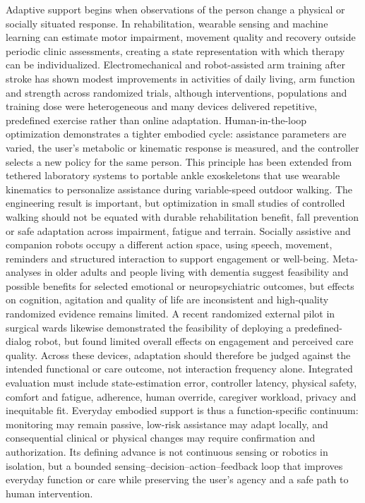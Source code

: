 \documentclass[12pt,a4paper]{article}
\begin{document}
Adaptive support begins when observations of the person change a physical or socially situated response. In rehabilitation, wearable sensing and machine learning can estimate motor impairment, movement quality and recovery outside periodic clinic assessments, creating a state representation with which therapy can be individualized. Electromechanical and robot-assisted arm training after stroke has shown modest improvements in activities of daily living, arm function and strength across randomized trials, although interventions, populations and training dose were heterogeneous and many devices delivered repetitive, predefined exercise rather than online adaptation. Human-in-the-loop optimization demonstrates a tighter embodied cycle: assistance parameters are varied, the user's metabolic or kinematic response is measured, and the controller selects a new policy for the same person. This principle has been extended from tethered laboratory systems to portable ankle exoskeletons that use wearable kinematics to personalize assistance during variable-speed outdoor walking. The engineering result is important, but optimization in small studies of controlled walking should not be equated with durable rehabilitation benefit, fall prevention or safe adaptation across impairment, fatigue and terrain. Socially assistive and companion robots occupy a different action space, using speech, movement, reminders and structured interaction to support engagement or well-being. Meta-analyses in older adults and people living with dementia suggest feasibility and possible benefits for selected emotional or neuropsychiatric outcomes, but effects on cognition, agitation and quality of life are inconsistent and high-quality randomized evidence remains limited. A recent randomized external pilot in surgical wards likewise demonstrated the feasibility of deploying a predefined-dialog robot, but found limited overall effects on engagement and perceived care quality. Across these devices, adaptation should therefore be judged against the intended functional or care outcome, not interaction frequency alone. Integrated evaluation must include state-estimation error, controller latency, physical safety, comfort and fatigue, adherence, human override, caregiver workload, privacy and inequitable fit. Everyday embodied support is thus a function-specific continuum: monitoring may remain passive, low-risk assistance may adapt locally, and consequential clinical or physical changes may require confirmation and authorization. Its defining advance is not continuous sensing or robotics in isolation, but a bounded sensing--decision--action--feedback loop that improves everyday function or care while preserving the user's agency and a safe path to human intervention.
\end{document}
